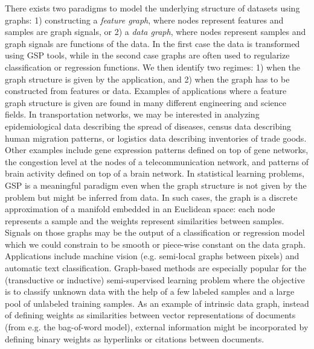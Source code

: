 \documentclass[a4paper]{scrartcl}
\begin{document}

There exists two paradigms to model the underlying structure of datasets using graphs: 1) constructing a
\textit{feature graph}, where nodes represent features and samples are graph
signals, or 2) a \textit{data graph}, where nodes represent samples and graph
signals are functions of the data. In the first case the data is transformed using
GSP tools, while in the second case graphs are often used to regularize
classification or regression functions. We then identify two regimes: 1) when
the graph structure is given by the application, and 2) when the graph has to be
constructed from features or data.
Examples of applications where a feature graph structure is given are found in
many different engineering and science fields. In transportation networks, we
may be interested in analyzing epidemiological data describing the spread of
diseases, census data describing human migration patterns, or logistics data
describing inventories of trade goods. Other examples include gene expression
patterns defined on top of gene networks, the congestion level at the nodes of a
telecommunication network, and patterns of brain activity defined on top of a
brain network.
In statistical learning problems, GSP is a meaningful paradigm even when the
graph structure is not given by the problem but might be inferred from data.  In
such cases, the graph is a discrete approximation of a manifold embedded in an
Euclidean space: each node represents a sample and the weights represent
similarities between samples. Signals on those graphs may be the output of a
classification or regression model which we could constrain to be smooth or
piece-wise constant on the data graph. Applications include machine vision (e.g.
semi-local graphs between pixels) and automatic text classification.
Graph-based methods are especially popular for the (transductive or inductive)
semi-supervised learning problem where the objective is to classify unknown data
with the help of a few labeled samples and a large pool of unlabeled training
samples.
As an example of intrinsic data graph, instead of defining weights as
similarities between vector representations of documents (from e.g. the
bag-of-word model), external information might be incorporated by defining
binary weights as hyperlinks or citations between documents.
\end{document}
